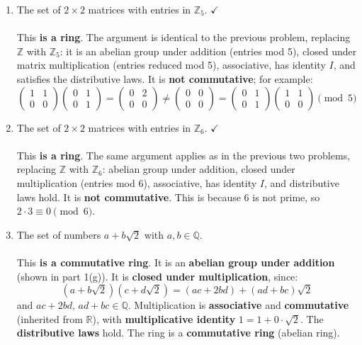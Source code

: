 \documentclass{article}
\newcommand{\Z}{\mathbb{Z}}
\newcommand{\Q}{\mathbb{Q}}
\newcommand{\Zn}[1]{\mathbb{Z}_{#1}}
\begin{document}
\begin{enumerate}
\begin{enumerate}
            \item The set of $2 \times 2$ matrices with entries in $\Zn{5}$. $\checkmark$
            \\
            \\ This \textbf{is a ring}. The argument is identical to the previous problem, replacing $\Z$ with $\Zn{5}$: it is an abelian group under addition (entries mod 5), closed under matrix multiplication (entries reduced mod 5), associative, has identity $I$, and satisfies the distributive laws. It is \textbf{not commutative}; for example:
            \[
                \begin{pmatrix}1&1\\0&0\end{pmatrix}\begin{pmatrix}0&1\\0&1\end{pmatrix}
                = \begin{pmatrix}0&2\\0&0\end{pmatrix}
                \neq
                \begin{pmatrix}0&0\\0&0\end{pmatrix}
                = \begin{pmatrix}0&1\\0&1\end{pmatrix}\begin{pmatrix}1&1\\0&0\end{pmatrix}
                \pmod{5}
            \]

            \item The set of $2 \times 2$ matrices with entries in $\Zn{6}$. $\checkmark$
            \\
            \\ This \textbf{is a ring}. The same argument applies as in the previous two problems, replacing $\Z$ with $\Zn{6}$: abelian group under addition, closed under multiplication (entries mod 6), associative, has identity $I$, and distributive laws hold. It is \textbf{not commutative}. This is because 6 is not prime, so $2 \cdot 3 \equiv 0 \pmod{6}$.

            \item The set of numbers $a + b\sqrt{2}$ with $a,b \in \Q$.
            \\
            \\ This \textbf{is a commutative ring}. It is an \textbf{abelian group under addition} (shown in part 1(g)). It is \textbf{closed under multiplication}, since:
            \[
                (a+b\sqrt{2})(c+d\sqrt{2}) = (ac+2bd) + (ad+bc)\sqrt{2}
            \]
            and $ac+2bd,\, ad+bc \in \Q$. Multiplication is \textbf{associative} and \textbf{commutative} (inherited from $\mathbb{R}$), with \textbf{multiplicative identity} $1 = 1+0\cdot\sqrt{2}$. The \textbf{distributive laws} hold. The ring is a \textbf{commutative ring} (abelian ring).


\end{enumerate}
\end{enumerate}
\end{document}

